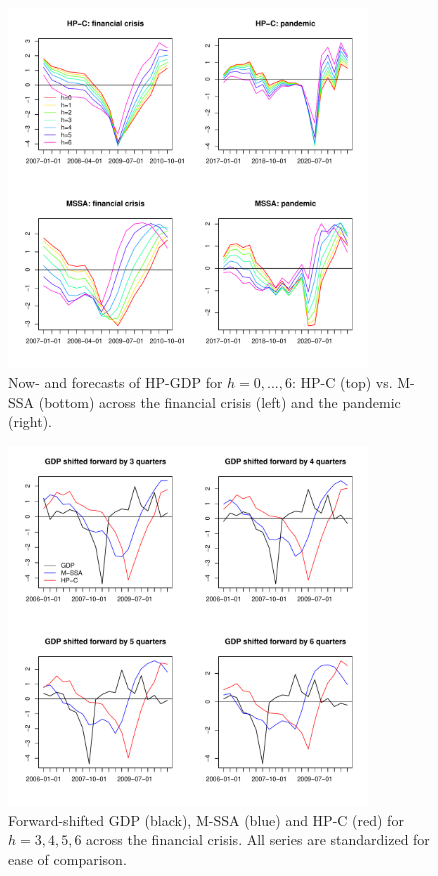 \documentclass[11pt,a4paper]{article}
\begin{document}
\begin{figure}[H]
    \begin{center}
        \includegraphics[width=0.85\textwidth]{./Figures/multivar_vs_univar.pdf}
        \caption{Now- and forecasts of HP-GDP for $h=0,...,6$: HP-C (top) vs. M-SSA (bottom) across the financial crisis (left) and the pandemic (right).
        \label{multivar_vs_univar}}
    \end{center}
\end{figure}


\begin{figure}[H]
    \begin{center}
        \includegraphics[width=0.85\textwidth]{./Figures/mssa_hpc_financial_crisis.pdf}
        \caption{Forward-shifted GDP (black), M-SSA (blue) and HP-C (red) for $h=3,4,5,6$ across the financial crisis. All series are standardized for ease of comparison.
        \label{mssa_hpc_financial_crisis}}
    \end{center}
\end{figure}
\end{document}
